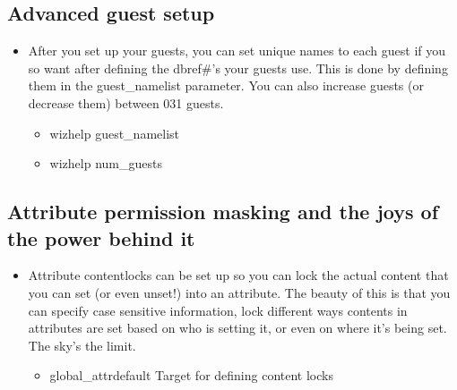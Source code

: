 \documentclass[letterpaper,10pt,english]{sphinxmanual}
\begin{document}
\subsection{Advanced guest setup}
\label{\detokenize{features:advanced-guest-setup}}\begin{itemize}
\item {} 
\sphinxAtStartPar
After you set up your guests, you can set unique names to each guest
if you so want after defining the dbref\#’s your guests use.  This is
done by defining them in the guest\_namelist parameter.  You can also
increase guests (or decrease them) between 0\sphinxhyphen{}31 guests.
\begin{itemize}
\item {} 
\sphinxAtStartPar
wizhelp guest\_namelist

\item {} 
\sphinxAtStartPar
wizhelp num\_guests

\end{itemize}

\end{itemize}


\subsection{Attribute permission masking and the joys of the power behind it}
\label{\detokenize{features:attribute-permission-masking-and-the-joys-of-the-power-behind-it}}\begin{itemize}
\item {} 
\sphinxAtStartPar
Attribute contentlocks can be set up so you can lock the actual
content that you can set (or even unset!) into an attribute.
The beauty of this is that you can specify case sensitive
information, lock different ways contents in attributes are set
based on who is setting it, or even on where it’s being set.
The sky’s the limit.
\begin{itemize}
\item {} 
\sphinxAtStartPar
global\_attrdefault    \sphinxhyphen{} Target for defining content locks

\end{itemize}

\end{itemize}
\end{document}
